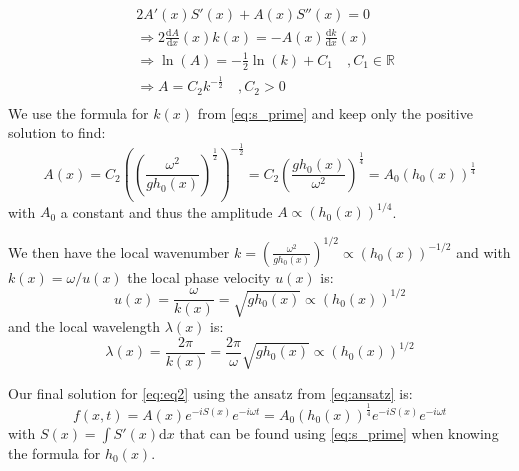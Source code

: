 \[
    \begin{aligned}
        & 2A'(x)S'(x) + A(x)S''(x) = 0 \\
        & \Rightarrow 2\frac{\mathrm{d}A}{\mathrm{d}x}(x)k(x) = - A(x) \frac{\mathrm{d}k}{\mathrm{d}x}(x) \\
        & \Rightarrow \ln(A) = -\frac{1}{2}\ln(k) + C_1 \quad , C_1 \in \mathbb{R} \\
        & \Rightarrow A = C_2 k^{-\frac{1}{2}} \quad , C_2>0 \\
    \end{aligned}
\]
We use the formula for $k(x)$ from \autoref{eq:s_prime} and keep only the positive solution to find:
\begin{equation}
    A(x) = C_2 \left(\left(\frac{\omega^2}{gh_0(x)}\right)^{\frac{1}{2}}\right)^{-\frac{1}{2}} = C_2 \left(\frac{gh_0(x)}{\omega^2}\right)^\frac{1}{4} = A_0 (h_0(x))^\frac{1}{4}
\end{equation}
with $A_0$ a constant and thus the amplitude $A \propto (h_0(x))^{1/4}$.

We then have the local wavenumber $k = \left(\frac{\omega^2}{gh_0(x)}\right)^{1/2} \propto (h_0(x))^{-1/2}$ and with $k(x) = \omega / u(x)$ the local phase velocity $u(x)$ is:
\begin{equation}
    u(x) = \frac{\omega}{k(x)} = \sqrt{gh_0(x)} \propto (h_0(x))^{1/2}
\end{equation}
and the local wavelength $\lambda(x)$ is:
\begin{equation}
    \lambda(x) = \frac{2\pi}{k(x)} = \frac{2\pi}{\omega}\sqrt{gh_0(x)}  \propto (h_0(x))^{1/2}
\end{equation}

Our final solution for \autoref{eq:eq2} using the ansatz from \autoref{eq:ansatz} is:
\begin{equation}
    f(x,t) = A(x)e^{-iS(x)}e^{-i\omega t} = A_0 (h_0(x))^\frac{1}{4}e^{-iS(x)}e^{-i\omega t}
\end{equation}
with $S(x) = \int S'(x) \mathrm{d}x$ that can be found using \autoref{eq:s_prime} when knowing the formula for $h_0(x)$.


